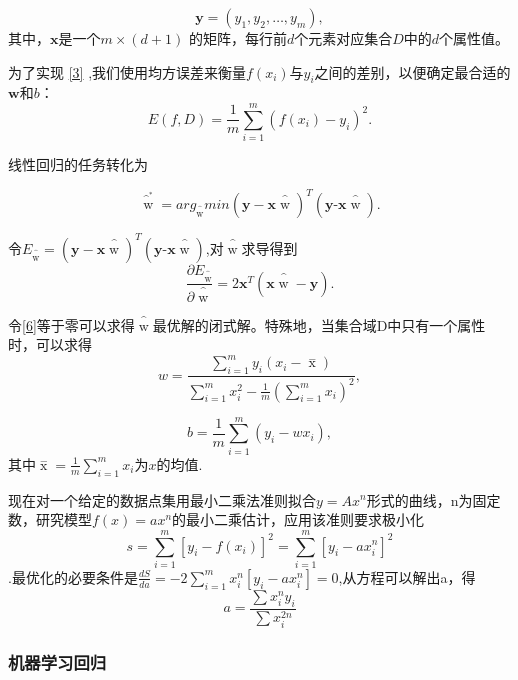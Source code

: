  $$\textbf{y}=(y_1,y_2,\dots,y_m),$$
 其中，$\textbf{x}$是一个$m \times (d+1)$ 的矩阵，每行前$d$个元素对应集合$D$中的$d$个属性值。
 
 为了实现 \ref{3} ,我们使用均方误差来衡量$f(x_i)$与$y_i$之间的差别，以便确定最合适的$\textbf{w}$和$b$：
 \begin{equation}
E(f,D)=\frac{1}{m}\sum_{i=1}^m(f(x_i)-y_i)^2.\label{4}
 \end{equation}

 线性回归的任务转化为
 
 \begin{equation}
 \mathop{w}\limits^{\^{}}^*=arg_{\mathop{w}\limits^{\^{}}}min(\textbf{y}-\textbf{x}\mathop{w}\limits^{\^{}})^T(\textbf{y-x}\mathop{w}\limits^{\^{}}).
 \label{5}
 \end{equation}
 
令$E_{\mathop{w}\limits^{\^{}}}=(\textbf{y}-\textbf{x}\mathop{w}\limits^{\^{}})^T(\textbf{y-x}\mathop{w}\limits^{\^{}})$,对$\mathop{w}\limits^{\^{}}$求导得到
\begin{equation}
\frac{\partial E_{\mathop{w}\limits^{\^{}}}}{\partial \mathop{w}\limits^{\^{}}}=2\textbf{x}^T(\textbf{x}\mathop{w}\limits^{\^{}}-\textbf{y}).
\label{6}
\end{equation}

令\ref{6}等于零可以求得$\mathop{w}\limits^{\^{}}$最优解的闭式解。特殊地，当集合域D中只有一个属性时，可以求得
\begin{equation}
w=\frac{\sum\limits_{i=1}^my_i(x_i-\mathop{x}\limits^{-})}{\sum\limits_{i=1}^mx_i^2-\frac{1}{m}(\sum\limits_{i=1}^mx_i)^2},
\label{7}
\end{equation}

\begin{equation}
b=\frac{1}{m}\sum\limits_{i=1}^m(y_i-wx_i),
\label{8}
\end{equation}
其中$\mathop{x}\limits^{-}=\frac{1}{m}\sum\limits_{i=1}^mx_i$为$x$的均值.

现在对一个给定的数据点集用最小二乘法准则拟合$y=Ax^n$形式的曲线，n为固定数，研究模型$f(x)=ax^n$的最小二乘估计，应用该准则要求极小化$$s=\sum_{i=1}^m[y_i-f(x_i)]^2=\sum_{i=1}^m[y_i-ax_i^n]^2$$.最优化的必要条件是$\frac{dS}{da}=-2\sum_{i=1}^mx_i^n[y_i-ax_i^n]=0$,从方程可以解出a，得$$a=\frac{\sum x_i^ny_i}{\sum x_i^{2n}}$$
 






\subsubsection{机器学习回归}


